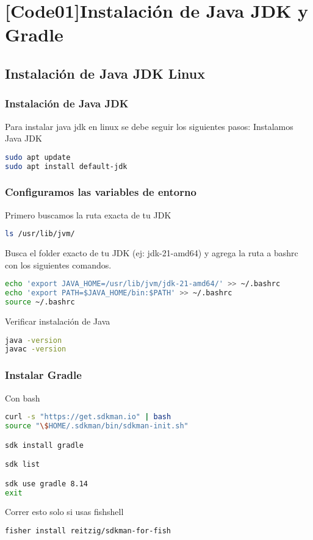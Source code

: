\section{[Code01]Instalación de Java JDK y Gradle}
\subsection{Instalación de Java JDK Linux}
\subsubsection{Instalación de Java JDK}
Para instalar java jdk en linux se debe seguir los siguientes pasos:
Instalamos Java JDK
\enablenumbering
\begin{lstlisting}[language=bash]
sudo apt update
sudo apt install default-jdk
\end{lstlisting}
\subsubsection{Configuramos las variables de entorno}
Primero buscamos la ruta exacta de tu JDK

\begin{lstlisting}[language=bash]
ls /usr/lib/jvm/
\end{lstlisting}
Busca el folder exacto de tu JDK (ej: jdk-21-amd64) y agrega la ruta a bashrc con los siguientes comandos.
\begin{lstlisting}[language=bash]
echo 'export JAVA_HOME=/usr/lib/jvm/jdk-21-amd64/' >> ~/.bashrc
echo 'export PATH=$JAVA_HOME/bin:$PATH' >> ~/.bashrc
source ~/.bashrc
\end{lstlisting}
Verificar instalación de Java
\begin{lstlisting}[language=bash]
java -version
javac -version
\end{lstlisting}

\subsubsection{Instalar Gradle}
Con bash
\begin{lstlisting}[language=bash]
curl -s "https://get.sdkman.io" | bash
source "\$HOME/.sdkman/bin/sdkman-init.sh"

sdk install gradle

sdk list

sdk use gradle 8.14
exit
\end{lstlisting}
Correr esto solo si usas fishshell
\begin{lstlisting}[language=bash]
fisher install reitzig/sdkman-for-fish
\end{lstlisting}


